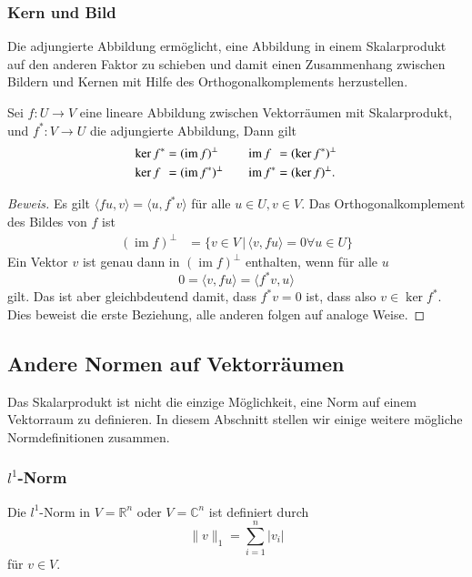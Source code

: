 \subsubsection{Kern und Bild}
Die adjungierte Abbildung ermöglicht, eine Abbildung in einem
Skalarprodukt auf den anderen Faktor zu schieben und damit
einen Zusammenhang zwischen Bildern und Kernen mit Hilfe des
Orthogonalkomplements herzustellen.

\begin{satz}
Sei $f\colon U\to V$ eine lineare Abbildung zwischen Vektorräumen
mit Skalarprodukt, und $f^*\colon V \to U$ die adjungierte Abbildung,
Dann gilt
\[
\begin{aligned}
\ker f^*
&=
(\operatorname{im}f)^\perp
&&
&
\operatorname{im}f\phantom{\mathstrut^*}
&=
(\ker f^*)^\perp
\\
\ker f\phantom{\mathstrut^*}
&=
(\operatorname{im}f^*)^\perp
&
&&
\operatorname{im}f^*
&=
(\ker f)^\perp.
\end{aligned}
\]
\end{satz}

\begin{proof}[Beweis]
Es gilt $\langle fu,v\rangle = \langle u,f^*v\rangle$ für
alle $u\in U, v\in V$.
Das Orthogonalkomplement des Bildes von $f$ ist
\begin{align*}
(\operatorname{im} f)^\perp
&=
\{
v\in V
\,|\,
\langle v, fu\rangle=0\forall u\in U
\}
\end{align*}
Ein Vektor $v$ ist genau dann in $(\operatorname{im}f)^\perp$ enthalten,
wenn für alle $u$ 
\[
0
=
\langle v,fu\rangle
=
\langle f^*v,u\rangle
\]
gilt.
Das ist aber gleichbdeutend damit, dass $f^*v=0$ ist, dass also 
$v\in\ker f^*$.
Dies beweist die erste Beziehung, alle anderen folgen auf analoge Weise.
\end{proof}

\subsection{Andere Normen auf Vektorräumen
\label{buch:subsection:andere-normen}}
Das Skalarprodukt ist nicht die einzige Möglichkeit, eine Norm auf einem
Vektorraum zu definieren.
In diesem Abschnitt stellen wir einige weitere mögliche Normdefinitionen
zusammen.

\subsubsection{$l^1$-Norm}
\begin{definition}
Die $l^1$-Norm in $V=\mathbb{R}^n$ oder $V=\mathbb{C}^n$ ist definiert durch
%
\[
\| v\|_1
=
\sum_{i=1}^n |v_i|
\]
für $v\in V$.
\end{definition}


